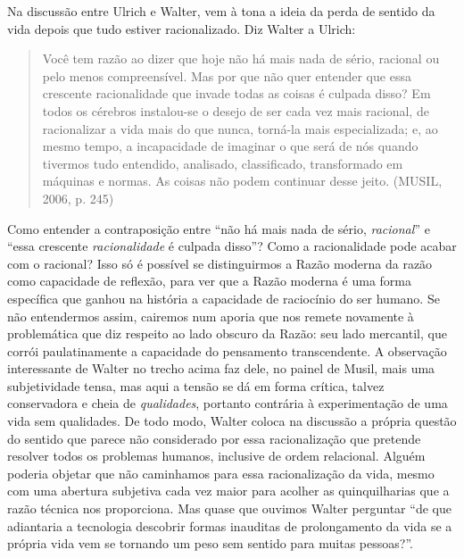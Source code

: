Na discussão entre Ulrich e Walter, vem à tona a ideia da perda de
sentido da vida depois que tudo estiver racionalizado. Diz Walter a
Ulrich:

\begin{quote}
Você tem razão ao dizer que hoje não há mais nada de sério, racional ou
pelo menos compreensível. Mas por que não quer entender que essa
crescente racionalidade que invade todas as coisas é culpada disso? Em
todos os cérebros instalou-se o desejo de ser cada vez mais racional, de
racionalizar a vida mais do que nunca, torná-la mais especializada; e,
ao mesmo tempo, a incapacidade de imaginar o que será de nós quando
tivermos tudo entendido, analisado, classificado, transformado em
máquinas e normas. As coisas não podem continuar desse jeito. (MUSIL,
2006, p. 245)
\end{quote}

Como entender a contraposição entre ``não há mais nada de sério,
\emph{racional}'' e ``essa crescente \emph{racionalidade} é culpada
disso''? Como a racionalidade pode acabar com o racional? Isso só é
possível se distinguirmos a Razão moderna da razão como capacidade de
reflexão, para ver que a Razão moderna é uma forma específica que ganhou
na história a capacidade de raciocínio do ser humano. Se não entendermos
assim, cairemos num aporia que nos remete novamente à problemática que
diz respeito ao lado obscuro da Razão: seu lado mercantil, que corrói
paulatinamente a capacidade do pensamento transcendente. A observação
interessante de Walter no trecho acima faz dele, no painel de Musil,
mais uma subjetividade tensa, mas aqui a tensão se dá em forma crítica,
talvez conservadora e cheia de \emph{qualidades}, portanto contrária à
experimentação de uma vida sem qualidades. De todo modo, Walter coloca
na discussão a própria questão do sentido que parece não considerado por
essa racionalização que pretende resolver todos os problemas humanos,
inclusive de ordem relacional. Alguém poderia objetar que não caminhamos
para essa racionalização da vida, mesmo com uma abertura subjetiva cada
vez maior para acolher as quinquilharias que a razão técnica nos
proporciona. Mas quase que ouvimos Walter perguntar ``de que adiantaria
a tecnologia descobrir formas inauditas de prolongamento da vida se a
própria vida vem se tornando um peso sem sentido para muitas pessoas?''.

